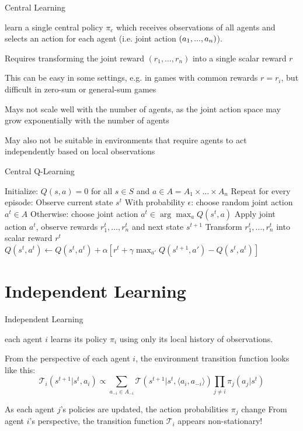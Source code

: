 \begin{frame}{Central Learning}

 learn a single central policy $\pi_c$ which receives observations of all agents and selects an action for each agent (i.e. joint action $(a_1,...,a_n)$). 

\blist
    \item<1-> Requires transforming the joint reward $(r_1, \ldots, r_n)$ into a single scalar reward $r$
    \item<2-> This can be easy in some settings, e.g. in games with common rewards $r = r_i$, but difficult in zero-sum or general-sum games
    \item<3-> Mays not scale well with the number of agents, as the joint action space may grow exponentially with the number of agents
    \item<4-> May also not be suitable in environments that require agents to act independently based on local observations
\elist
\end{frame}

\begin{frame}{Central Q-Learning}


\State Initialize: \( Q(s, a) = 0 \) for all \( s \in S \) and \( a \in A = A_1 \times \ldots \times A_n \)
\State Repeat for every episode:
    \State Observe current state \( s^t \)
    \State With probability \( \epsilon \): choose random joint action \( a^t \in A \)
    \State Otherwise: choose joint action \( a^t \in \arg\max_a Q(s^t, a) \)
    \State Apply joint action \( a^t \), observe rewards \( r_1^t, \ldots, r_n^t \) and next state \( s^{t+1} \)
    \State Transform \( r_1^t, \ldots, r_n^t \) into scalar reward \( r^t \)
    \State \( Q(s^t, a^t) \leftarrow Q(s^t, a^t) + \alpha [ r^t + \gamma \max_{a'} Q(s^{t+1}, a') - Q(s^t, a^t) ] \)
\EndFor
\ealg

\end{frame}

\section{Independent Learning}

\begin{frame}{Independent Learning}

 each agent $i$ learns its policy $\pi_i$ using only its local history of observations.

\blist
    \item From the perspective of each agent $i$, the environment transition function looks like this:
\elist
\[
\mathcal{T}_i(s^{t+1} | s^t, a_i) \propto \sum_{a_{-i} \in A_{-i}} \mathcal{T}(s^{t+1} | s^t, \langle a_i, a_{-i} \rangle) \prod_{j \neq i} \pi_j(a_j | s^t)
\]
\blist
    \item As each agent $j$'s policies are updated, the action probabilities $\pi_j$ change
    \listtab From agent $i$'s perspective, the transition function $\mathcal{T}_i$ appears non-stationary!
\elist
    
\end{frame}

